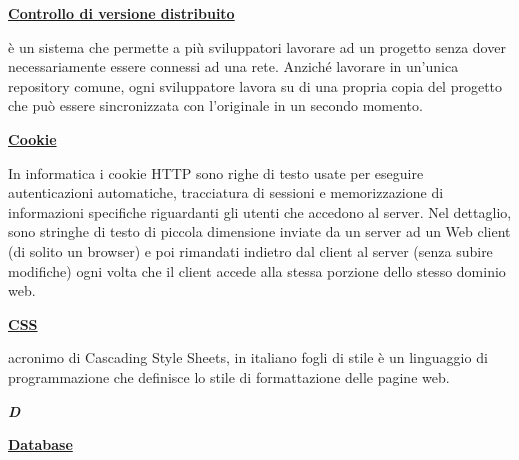 \bigskip
\begin{addmargin}[0em]{0em}
	\textbf{\underline{Controllo di versione distribuito}}
\end{addmargin}

\medskip
\begin{addmargin}[5em]{1em}	
è un sistema che permette a più sviluppatori lavorare ad un progetto senza dover necessariamente essere connessi ad una rete. Anziché lavorare in un'unica repository comune, ogni sviluppatore lavora su di una propria copia del progetto che può essere sincronizzata con l'originale in un secondo momento.
\end{addmargin}

\bigskip
\begin{addmargin}[0em]{0em}	
	\textbf{\underline{Cookie}}
\end{addmargin}
	
\medskip
\begin{addmargin}[5em]{1em}	
In informatica i cookie HTTP sono righe di testo usate per eseguire autenticazioni automatiche, tracciatura di sessioni e memorizzazione di informazioni specifiche riguardanti gli utenti che accedono al server. Nel dettaglio, sono stringhe di testo di piccola dimensione inviate da un server ad un Web client (di solito un browser) e poi rimandati indietro dal client al server (senza subire modifiche) ogni volta che il client accede alla stessa porzione dello stesso dominio web.
\end{addmargin}

\bigskip
\begin{addmargin}[0em]{0em}	
	\textbf{\underline{CSS}}
\end{addmargin}

\medskip
	\begin{addmargin}[5em]{1em}	
acronimo di Cascading Style Sheets, in italiano fogli di stile è un linguaggio di programmazione che definisce lo stile di formattazione delle pagine web.
\end{addmargin}
	
\newpage

\cleardoublepage
{}
{}
\noindent\hrulefill\hspace{4mm}\textbf{\textsl{\Huge{D}}}\hspace{4mm}\hrulefill

\vspace*{2\bigskipamount}

\begin{addmargin}[0em]{0em}	
	\textbf{\underline{Database}}
\end{addmargin}

